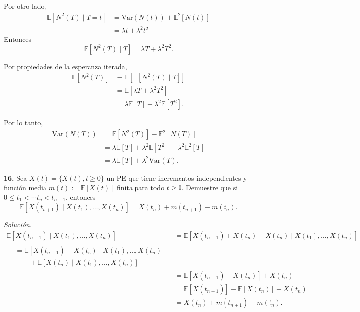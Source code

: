 \documentclass[12pt]{article}
\newcommand{\E}{\mathbb{E}}
\begin{document}
Por otro lado, 
\begin{align*}
\E[N^2(T) \mid T = t] &= \textrm{Var}(N(t)) + \E^2[N(t)] \\    
&= \lambda t + \lambda^2 t^2
\end{align*}
Entonces
\[ \E[N^2(T) \mid T] = \lambda T + \lambda^2 T^2. \]

Por propiedades de la esperanza iterada, 
\begin{align*}
    \E[N^2(T)] &= \E [ \E[N^2(T) \mid T] ] \\
                &= \E [\lambda T + \lambda^2 T^2] \\
                &= \lambda \E[T] + \lambda^2 \E[T^2].
\end{align*}

Por lo tanto,
\begin{align*}
    \textrm{Var}(N(T)) &= \E[N^2(T)] - \E^2[N(T)] \\
    &= \lambda \E[T] + \lambda^2 \E[T^2] -  \lambda^2 \E^2[T] \\
    &= \lambda \E[T] + \lambda^2 \textrm{Var}(T).
\end{align*}


\begin{tcolorbox}[colback=blue!5!white, colframe=blue!5!white, arc=0mm, boxrule=0pt]
    \textbf{16.} Sea $X(t) = \{X(t), t \geq 0\}$ un PE que tiene incrementos independientes y función media $m(t) := \E[X(t)]$ finita para todo $t\geq 0$. Demuestre que si $0 \leq t_1 < \cdots t_n < t_{n+1}$, entonces
    \[ \E[X(t_{n+1}) \mid X(t_1), \ldots, X(t_n)] = X(t_n) + m(t_{n+1}) - m(t_n). \]
\end{tcolorbox} 

\noindent
\textit{Solución}. 
\begin{align*}
    \E[X(t_{n+1}) \mid X(t_1), \ldots, X(t_n)] &= \E[X(t_{n+1}) + X(t_n) - X(t_n) \mid X(t_1), \ldots, X(t_n)] \\
    \begin{split}
    &= \E[X(t_{n+1}) - X(t_n) \mid X(t_1), \ldots, X(t_n)] \\
        & \quad \quad + \E[X(t_n)\mid X(t_1), \ldots, X(t_n)]
    \end{split}  \\
    &= \E[X(t_{n+1}) - X(t_n)] + X(t_n) \\
    &= \E[X(t_{n+1})] - \E[X(t_n)] + X(t_n) \\
    &= X(t_n) + m(t_{n+1}) - m(t_n).
\end{align*}
\end{document}
